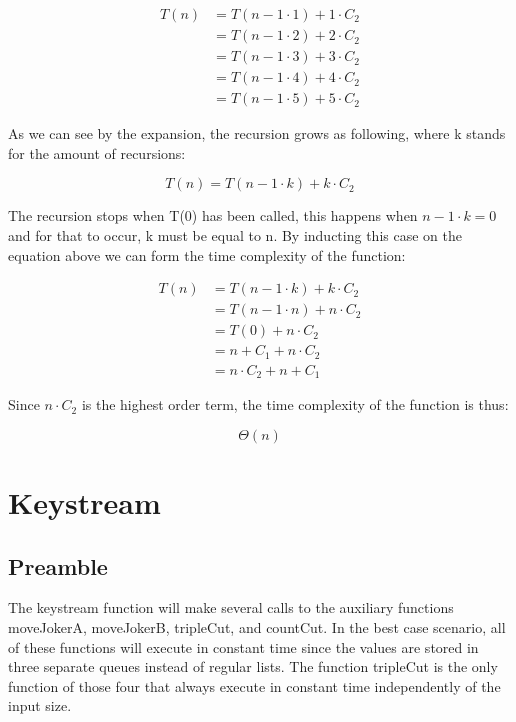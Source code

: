 ﻿\documentclass[12pt,a4paper]{article}
\begin{document}
\begin{equation}
\begin{aligned}
T(n) &= T(n - 1 \cdot 1) + 1 \cdot C_2 \\
 &= T(n - 1 \cdot 2) + 2 \cdot C_2 \\
 &= T(n - 1 \cdot 3) + 3 \cdot C_2 \\
 &= T(n - 1 \cdot 4) + 4 \cdot C_2 \\
 &= T(n - 1 \cdot 5) + 5 \cdot C_2
\end{aligned}
\end{equation}

As we can see by the expansion, the recursion grows as following, where k stands for the amount of recursions:

\begin{equation}
T(n) = T(n - 1 \cdot k) + k \cdot C_2
\end{equation}

The recursion stops when T(0) has been called, this happens when \(n - 1 \cdot k = 0\) and for that to occur, k must be equal to n.
By inducting this case on the equation above we can form the time complexity of the function:

\begin{equation}
\begin{aligned}
T(n) &= T(n - 1 \cdot k) + k \cdot C_2 \\
 &= T(n - 1 \cdot n) + n \cdot C_2 \\
 &= T(0) + n \cdot C_2 \\
 &= n + C_1 + n \cdot C_2 \\
 &= n \cdot C_2 + n + C_1
\end{aligned}
\end{equation}

Since \(n \cdot C_2\) is the highest order term, the time complexity of the function is thus:

\begin{equation}
\Theta(n)
\end{equation}

\newpage

\section{Keystream}

\subsection{Preamble}
The keystream function will make several calls to the auxiliary functions moveJokerA, moveJokerB, tripleCut, and countCut.
In the best case scenario, all of these functions will execute in constant time since the values are stored in three separate queues instead of regular lists.
The function tripleCut is the only function of those four that always execute in constant time independently of the input size.
\end{document}

